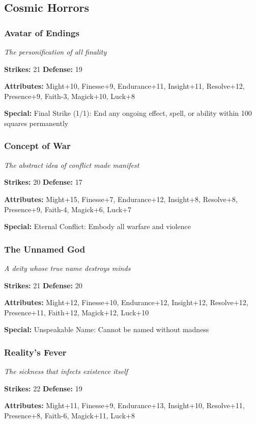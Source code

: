 \documentclass[10pt,twoside]{article}
\begin{document}
\subsection{Cosmic Horrors}

\subsubsection{Avatar of Endings}
\textit{The personification of all finality}

\textbf{Strikes:} 21 \quad \textbf{Defense:} 19

\textbf{Attributes:} Might+10, Finesse+9, Endurance+11, Insight+11, Resolve+12, Presence+9, Faith-3, Magick+10, Luck+8

\textbf{Special:} Final Strike (1/1): End any ongoing effect, spell, or ability within 100 squares permanently

\subsubsection{Concept of War}
\textit{The abstract idea of conflict made manifest}

\textbf{Strikes:} 20 \quad \textbf{Defense:} 17

\textbf{Attributes:} Might+15, Finesse+7, Endurance+12, Insight+8, Resolve+8, Presence+9, Faith-4, Magick+6, Luck+7

\textbf{Special:} Eternal Conflict: Embody all warfare and violence

\subsubsection{The Unnamed God}
\textit{A deity whose true name destroys minds}

\textbf{Strikes:} 21 \quad \textbf{Defense:} 20

\textbf{Attributes:} Might+12, Finesse+10, Endurance+12, Insight+12, Resolve+12, Presence+11, Faith+12, Magick+12, Luck+10

\textbf{Special:} Unspeakable Name: Cannot be named without madness

\subsubsection{Reality's Fever}
\textit{The sickness that infects existence itself}

\textbf{Strikes:} 22 \quad \textbf{Defense:} 19

\textbf{Attributes:} Might+11, Finesse+9, Endurance+13, Insight+10, Resolve+11, Presence+8, Faith-6, Magick+11, Luck+8
\end{document}
